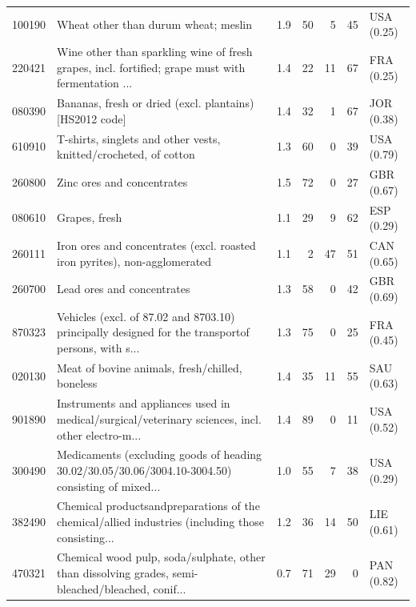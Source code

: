 \begin{tabular}{@{}l p{6.4cm} r r r r l@{}}
100190 & Wheat other than durum wheat; meslin & 1.9 & 50 & 5 & 45 & USA (0.25) \\
220421 & Wine other than sparkling wine of fresh grapes, incl. fortified; grape must with fermentation ... & 1.4 & 22 & 11 & 67 & FRA (0.25) \\
080390 & Bananas, fresh or dried (excl. plantains) [HS2012 code] & 1.4 & 32 & 1 & 67 & JOR (0.38) \\
610910 & T-shirts, singlets and other vests, knitted/\allowbreak{}crocheted, of cotton & 1.3 & 60 & 0 & 39 & USA (0.79) \\
260800 & Zinc ores and concentrates & 1.5 & 72 & 0 & 27 & GBR (0.67) \\
080610 & Grapes, fresh & 1.1 & 29 & 9 & 62 & ESP (0.29) \\
260111 & Iron ores and concentrates (excl. roasted iron pyrites), non-agglomerated & 1.1 & 2 & 47 & 51 & CAN (0.65) \\
260700 & Lead ores and concentrates & 1.3 & 58 & 0 & 42 & GBR (0.69) \\
870323 & Vehicles (excl. of 87.02 and 8703.10) principally designed for the transportof persons, with s... & 1.3 & 75 & 0 & 25 & FRA (0.45) \\
020130 & Meat of bovine animals, fresh/\allowbreak{}chilled, boneless & 1.4 & 35 & 11 & 55 & SAU (0.63) \\
901890 & Instruments and appliances used in medical/\allowbreak{}surgical/\allowbreak{}veterinary sciences, incl. other electro-m... & 1.4 & 89 & 0 & 11 & USA (0.52) \\
300490 & Medicaments (excluding goods of heading 30.02/\allowbreak{}30.05/\allowbreak{}30.06/\allowbreak{}3004.10-3004.50) consisting of mixed... & 1.0 & 55 & 7 & 38 & USA (0.29) \\
382490 & Chemical productsandpreparations of the chemical/\allowbreak{}allied industries (including those consisting... & 1.2 & 36 & 14 & 50 & LIE (0.61) \\
470321 & Chemical wood pulp, soda/\allowbreak{}sulphate, other than dissolving grades, semi-bleached/\allowbreak{}bleached, conif... & 0.7 & 71 & 29 & 0 & PAN (0.82) \\
\bottomrule
\end{tabular}
